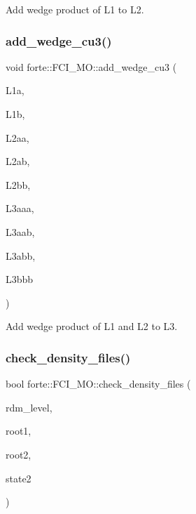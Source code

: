 Add wedge product of L1 to L2. 

\mbox{\label{classforte_1_1_f_c_i___m_o_a2066f908f542676a269de5b5daeb5bd2}} 
\subsubsection{\texorpdfstring{add\+\_\+wedge\+\_\+cu3()}{add\_wedge\_cu3()}}
{\footnotesize\ttfamily void forte\+::\+F\+C\+I\+\_\+\+M\+O\+::add\+\_\+wedge\+\_\+cu3 (\begin{DoxyParamCaption}\item[{const ambit\+::\+Tensor \&}]{L1a,  }\item[{const ambit\+::\+Tensor \&}]{L1b,  }\item[{const ambit\+::\+Tensor \&}]{L2aa,  }\item[{const ambit\+::\+Tensor \&}]{L2ab,  }\item[{const ambit\+::\+Tensor \&}]{L2bb,  }\item[{ambit\+::\+Tensor \&}]{L3aaa,  }\item[{ambit\+::\+Tensor \&}]{L3aab,  }\item[{ambit\+::\+Tensor \&}]{L3abb,  }\item[{ambit\+::\+Tensor \&}]{L3bbb }\end{DoxyParamCaption})\hspace{0.3cm}{\ttfamily [protected]}}



Add wedge product of L1 and L2 to L3. 

\mbox{\label{classforte_1_1_f_c_i___m_o_a5cbd29e9e73a93b9cfd8271063dc8ce3}} 
\subsubsection{\texorpdfstring{check\+\_\+density\+\_\+files()}{check\_density\_files()}}
{\footnotesize\ttfamily bool forte\+::\+F\+C\+I\+\_\+\+M\+O\+::check\+\_\+density\+\_\+files (\begin{DoxyParamCaption}\item[{int}]{rdm\+\_\+level,  }\item[{int}]{root1,  }\item[{int}]{root2,  }\item[{const \mbox{\hyperlink{classforte_1_1_state_info}{State\+Info}} \&}]{state2 }\end{DoxyParamCaption})}



